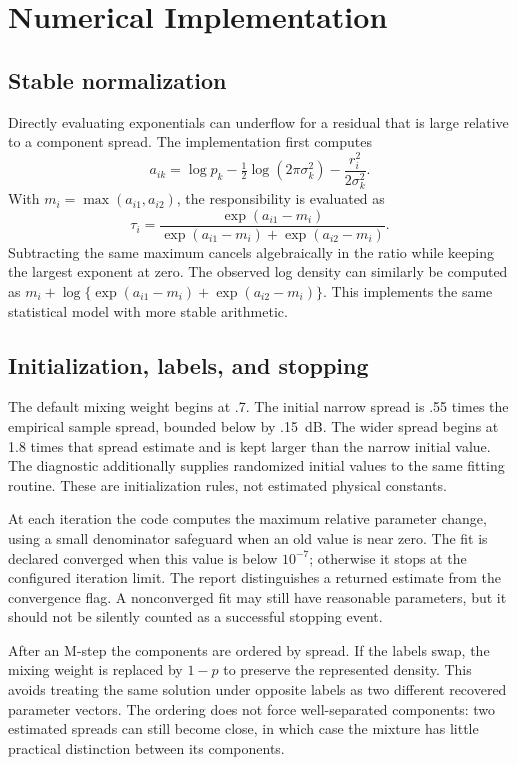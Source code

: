 \documentclass[conference,letterpaper]{IEEEtran}
\begin{document}
\section{Numerical Implementation}
\label{sec:numerical}
\subsection{Stable normalization}
Directly evaluating exponentials can underflow for a residual that is large relative to a component spread. The implementation first computes
\begin{equation}
a_{ik}=\log p_k-\tfrac12\log(2\pi\sigma_k^2)
-\frac{r_i^2}{2\sigma_k^2}.
\end{equation}
With $m_i=\max(a_{i1},a_{i2})$, the responsibility is evaluated as
\begin{equation}
\tau_i=\frac{\exp(a_{i1}-m_i)}
{\exp(a_{i1}-m_i)+\exp(a_{i2}-m_i)}.
\end{equation}
Subtracting the same maximum cancels algebraically in the ratio while keeping the largest exponent at zero. The observed log density can similarly be computed as $m_i+\log\{\exp(a_{i1}-m_i)+\exp(a_{i2}-m_i)\}$. This implements the same statistical model with more stable arithmetic.

\subsection{Initialization, labels, and stopping}
The default mixing weight begins at .7. The initial narrow spread is .55 times the empirical sample spread, bounded below by .15~dB. The wider spread begins at 1.8 times that spread estimate and is kept larger than the narrow initial value. The diagnostic additionally supplies randomized initial values to the same fitting routine. These are initialization rules, not estimated physical constants.

At each iteration the code computes the maximum relative parameter change, using a small denominator safeguard when an old value is near zero. The fit is declared converged when this value is below $10^{-7}$; otherwise it stops at the configured iteration limit. The report distinguishes a returned estimate from the convergence flag. A nonconverged fit may still have reasonable parameters, but it should not be silently counted as a successful stopping event.

After an M-step the components are ordered by spread. If the labels swap, the mixing weight is replaced by $1-p$ to preserve the represented density. This avoids treating the same solution under opposite labels as two different recovered parameter vectors. The ordering does not force well-separated components: two estimated spreads can still become close, in which case the mixture has little practical distinction between its components.
\end{document}
